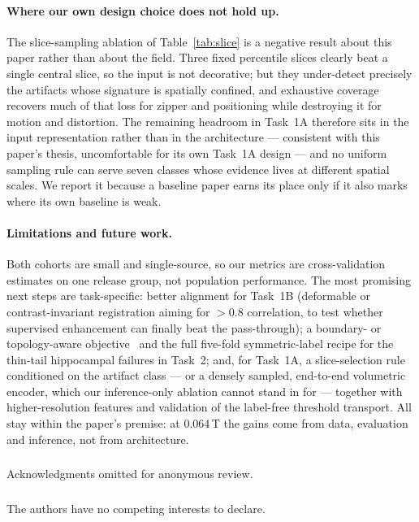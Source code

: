 \documentclass[runningheads]{llncs}
\begin{document}
\paragraph{Where our own design choice does not hold up.}
The slice-sampling ablation of Table~\ref{tab:slice} is a negative result about this
paper rather than about the field. Three fixed percentile slices clearly beat a single
central slice, so the input is not decorative; but they under-detect precisely the
artifacts whose signature is spatially confined, and exhaustive coverage recovers much
of that loss for zipper and positioning while destroying it for motion and distortion.
The remaining headroom in Task~1A therefore sits in the input representation rather
than in the architecture --- consistent with this paper's thesis, uncomfortable for its
own Task~1A design --- and no uniform sampling rule can serve seven classes whose
evidence lives at different spatial scales. We report it because a baseline paper earns
its place only if it also marks where its own baseline is weak.

\paragraph{Limitations and future work.}
Both cohorts are small and single-source, so our metrics are cross-validation
estimates on one release group, not population performance. The most promising
next steps are task-specific: better alignment for Task~1B (deformable or
contrast-invariant registration aiming for $>0.8$ correlation, to test whether
supervised enhancement can finally beat the pass-through); a boundary- or
topology-aware objective~\cite{kervadec2021boundary} and the full five-fold
symmetric-label recipe for the thin-tail hippocampal failures in Task~2;
and, for Task~1A, a slice-selection rule conditioned on the artifact class --- or a
densely sampled, end-to-end volumetric encoder, which our inference-only ablation
cannot stand in for --- together with higher-resolution features and validation of the
label-free threshold transport. All stay within the paper's premise: at 0.064\,T the gains come from
data, evaluation and inference, not from architecture.

\begin{credits}
\subsubsection{\ackname}
Acknowledgments omitted for anonymous review.
\subsubsection{\discintname}
The authors have no competing interests to declare.
\end{credits}
\end{document}
